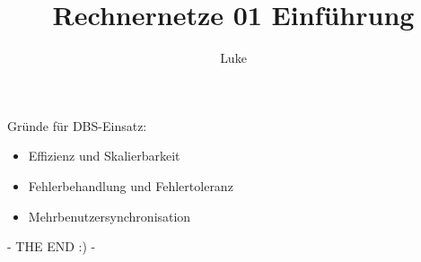 \documentclass[a4paper, 12pt] {article} %
\title{Rechnernetze 01 Einführung}
\begin{document}
\maketitle
\author{Luke}

Gründe für DBS-Einsatz:
\begin{itemize}
\item Effizienz und Skalierbarkeit
\item Fehlerbehandlung und Fehlertoleranz
\item Mehrbenutzersynchronisation
\end{itemize}



- THE END  :) - 

\begin{lstlisting}

\end{lstlisting}
\end{document}
